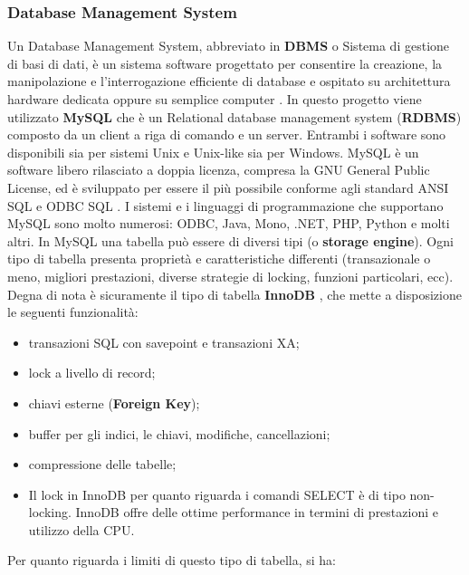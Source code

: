 \newpage

\subsubsection{Database Management System}
Un Database Management System, abbreviato in \textbf{DBMS} o Sistema di gestione di basi di dati, è un sistema software progettato per consentire la creazione, la manipolazione e l'interrogazione efficiente di database e ospitato su architettura hardware dedicata oppure su semplice computer \cite{sito_dbms}.\newline \newline
In questo progetto viene utilizzato \textbf{MySQL} che è un Relational database management system (\textbf{RDBMS}) composto da un client a riga di comando e un server. Entrambi i software sono disponibili sia per sistemi Unix e Unix-like sia per Windows.
\newline
MySQL è un software libero rilasciato a doppia licenza, compresa la GNU General Public License, ed è sviluppato per essere il più possibile conforme agli standard ANSI SQL e ODBC SQL \cite{sito_mysql_license}.
\newline
I sistemi e i linguaggi di programmazione che supportano MySQL sono molto numerosi: ODBC, Java, Mono, .NET, PHP, Python e molti altri.
\newline
In MySQL una tabella può essere di diversi tipi (o \textbf{storage engine}). Ogni tipo di tabella presenta proprietà e caratteristiche differenti (transazionale o meno, migliori prestazioni, diverse strategie di locking, funzioni particolari, ecc). 
Degna di nota è sicuramente il tipo di tabella \textbf{InnoDB} \cite{sito_innodb},
che mette a  disposizione le seguenti funzionalità:
\begin{itemize}
\item transazioni SQL con savepoint e transazioni XA;
\item lock a livello di record;
\item chiavi esterne (\textbf{Foreign Key});
\item buffer per gli indici, le chiavi, modifiche, cancellazioni;
\item compressione delle tabelle;
\item Il lock in InnoDB per quanto riguarda i comandi SELECT è di tipo non-locking. InnoDB offre delle ottime performance in termini di prestazioni e utilizzo della CPU.
\end{itemize}
Per quanto riguarda i limiti di questo tipo di tabella, si ha:

